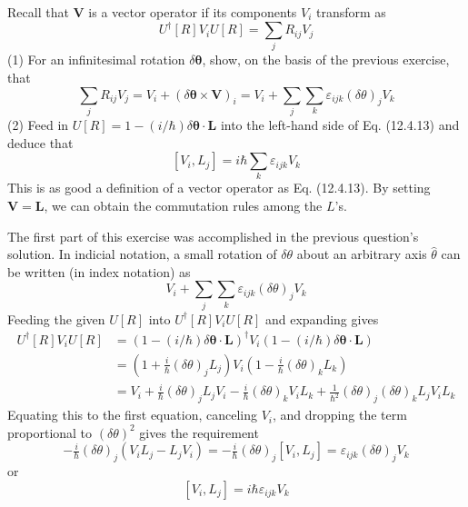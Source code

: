 \documentclass[../principles-of-quantum-mechanics.tex]{subfiles}
\begin{document}
\begin{questions}
	\question Recall that $\mathbf{V}$ is a vector operator if its components $V_i$ transform as
	$$U^\dagger[R]V_iU[R] = \sum_j R_{ij} V_j$$
	(1) For an infinitesimal rotation $\delta\boldsymbol{\theta}$, show, on the basis of the previous exercise, that
	$$\sum_j R_{ij}V_j = V_i + (\delta\boldsymbol{\theta}\times\mathbf{V})_i = V_i + \sum_j\sum_k\varepsilon_{ijk}(\delta\theta)_jV_k$$
	(2) Feed in $U[R] = 1 - (i/\hbar)\delta\boldsymbol{\theta}\cdot\mathbf{L}$ into the left-hand side of Eq. (12.4.13) and deduce that
	$$[V_i, L_j] = i\hbar\sum_k \varepsilon_{ijk}V_k$$
	This is as good a definition of a vector operator as Eq. (12.4.13). By setting $\mathbf{V} = \mathbf{L}$, we can obtain the commutation rules among the $L$'s.
	
	\begin{solution}
		The first part of this exercise was accomplished in the previous question's solution. In indicial notation, a small rotation of $\delta\theta$ about an arbitrary axis $\hat{\theta}$ can be written (in index notation) as
		$$V_i + \sum_j\sum_k\varepsilon_{ijk}(\delta\theta)_jV_k$$
		Feeding the given $U[R]$ into $U^\dagger[R]V_iU[R]$ and expanding gives
		\begin{align*}
			U^\dagger[R]V_iU[R] &= (1 - (i/\hbar)\delta\boldsymbol{\theta}\cdot\mathbf{L})^\dagger V_i(1 - (i/\hbar)\delta\boldsymbol{\theta}\cdot\mathbf{L}) \\
			&= (1 + \tfrac{i}{\hbar}(\delta\theta)_jL_j)V_i(1 - \tfrac{i}{\hbar}(\delta\theta)_kL_k) \\
			&= V_i + \tfrac{i}{\hbar}(\delta\theta)_jL_jV_i - \tfrac{i}{\hbar}(\delta\theta)_kV_iL_k + \tfrac{1}{\hbar^2}(\delta\theta)_j(\delta\theta)_kL_jV_iL_k
		\end{align*}
		Equating this to the first equation, canceling $V_i$, and dropping the term proportional to $(\delta\theta)^2$ gives the requirement
		$$-\tfrac{i}{\hbar}(\delta\theta)_j(V_iL_j - L_jV_i) = -\tfrac{i}{\hbar}(\delta\theta)_j[V_i, L_j] = \varepsilon_{ijk}(\delta\theta)_jV_k$$
		or
		$$[V_i, L_j] = i\hbar\varepsilon_{ijk}V_k$$
	\end{solution}


	\setcounter{subsection}{4}
	\setcounter{question}{0}

\end{questions}
\end{document}
